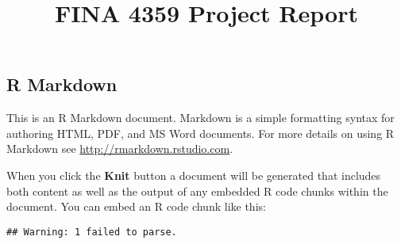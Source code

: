 \documentclass[
]{article}
\title{FINA 4359 Project Report}
\author{}
\date{\vspace{-2.5em}}
\begin{document}
\maketitle

\hypertarget{r-markdown}{%
\subsection{R Markdown}\label{r-markdown}}

This is an R Markdown document. Markdown is a simple formatting syntax
for authoring HTML, PDF, and MS Word documents. For more details on
using R Markdown see \url{http://rmarkdown.rstudio.com}.

When you click the \textbf{Knit} button a document will be generated
that includes both content as well as the output of any embedded R code
chunks within the document. You can embed an R code chunk like this:

\begin{verbatim}
## Warning: 1 failed to parse.
\end{verbatim}
\end{document}

